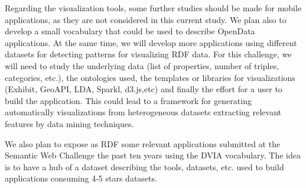 \documentclass[a4paper,11pt]{report}
\begin{document}
Regarding the visualization tools, some further studies should be made for mobile applications, as they are not considered in this current study. We plan also to develop a small vocabulary that could be used to describe OpenData applications. At the same time, we will develop  more applications using different datasets for detecting patterns for visualizing RDF data. For this challenge, we will need to study the underlying data (list of properties, number of triples, categories, etc.), the ontologies used, the templates or libraries for visualizations (Exhibit, GeoAPI, LDA, Sparkl, d3.js,etc) and finally the effort for a user to build the application. This could lead to a framework for generating automatically visualizations from heterogeneous datasets extracting relevant features by data mining techniques. 

We also plan to expose as RDF some relevant applications submitted at the Semantic Web Challenge the past ten years using the DVIA vocabulary. The idea is to have a hub of a dataset describing the tools, datasets, etc.  used to build  applications consuming 4-5 stars datasets.


\nocite{*}



\end{document}
